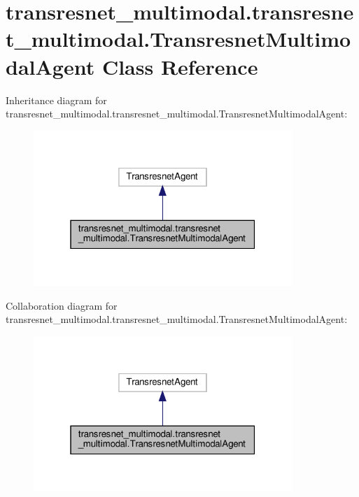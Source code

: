 \hypertarget{classtransresnet__multimodal_1_1transresnet__multimodal_1_1TransresnetMultimodalAgent}{}\section{transresnet\+\_\+multimodal.\+transresnet\+\_\+multimodal.\+Transresnet\+Multimodal\+Agent Class Reference}
\label{classtransresnet__multimodal_1_1transresnet__multimodal_1_1TransresnetMultimodalAgent}


Inheritance diagram for transresnet\+\_\+multimodal.\+transresnet\+\_\+multimodal.\+Transresnet\+Multimodal\+Agent\+:
\nopagebreak
\begin{figure}[H]
\begin{center}
\leavevmode
\includegraphics[width=277pt]{classtransresnet__multimodal_1_1transresnet__multimodal_1_1TransresnetMultimodalAgent__inherit__graph}
\end{center}
\end{figure}


Collaboration diagram for transresnet\+\_\+multimodal.\+transresnet\+\_\+multimodal.\+Transresnet\+Multimodal\+Agent\+:
\nopagebreak
\begin{figure}[H]
\begin{center}
\leavevmode
\includegraphics[width=277pt]{classtransresnet__multimodal_1_1transresnet__multimodal_1_1TransresnetMultimodalAgent__coll__graph}
\end{center}
\end{figure}
